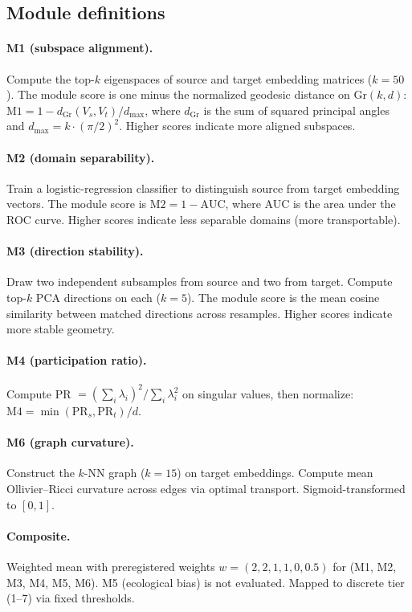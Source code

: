 \documentclass[9pt,lineno]{elife}
\newcommand{\Gr}{\mathrm{Gr}}
\begin{document}
\subsection{Module definitions}

\paragraph{M1 (subspace alignment).} Compute the top-$k$ eigenspaces of source and target embedding matrices ($k = 50$). The module score is one minus the normalized geodesic distance on $\Gr(k, d)$: $\text{M1} = 1 - d_{\Gr}(V_s, V_t) / d_{\max}$, where $d_{\Gr}$ is the sum of squared principal angles and $d_{\max} = k \cdot (\pi/2)^2$. Higher scores indicate more aligned subspaces.

\paragraph{M2 (domain separability).} Train a logistic-regression classifier to distinguish source from target embedding vectors. The module score is $\text{M2} = 1 - \text{AUC}$, where AUC is the area under the ROC curve. Higher scores indicate less separable domains (more transportable).

\paragraph{M3 (direction stability).} Draw two independent subsamples from source and two from target. Compute top-$k$ PCA directions on each ($k = 5$). The module score is the mean cosine similarity between matched directions across resamples. Higher scores indicate more stable geometry.

\paragraph{M4 (participation ratio).} Compute PR $= (\sum_i \lambda_i)^2 / \sum_i \lambda_i^2$ on singular values, then normalize: $\text{M4} = \min(\text{PR}_s, \text{PR}_t) / d$.

\paragraph{M6 (graph curvature).} Construct the $k$-NN graph ($k = 15$) on target embeddings. Compute mean Ollivier--Ricci curvature across edges via optimal transport. Sigmoid-transformed to $[0, 1]$.

\paragraph{Composite.} Weighted mean with preregistered weights $w = (2, 2, 1, 1, 0, 0.5)$ for (M1, M2, M3, M4, M5, M6). M5 (ecological bias) is not evaluated. Mapped to discrete tier (1--7) via fixed thresholds.
\end{document}
